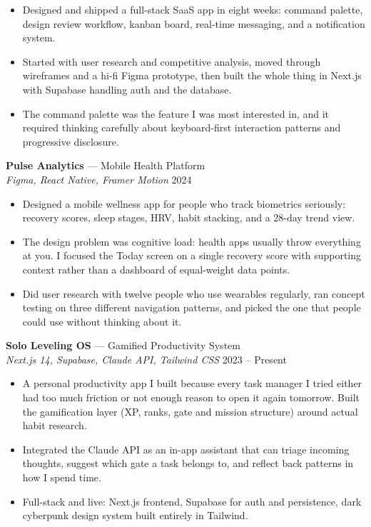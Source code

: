 \documentclass[11pt, letterpaper]{article}
\begin{document}
\begin{itemize}
  \item Designed and shipped a full-stack SaaS app in eight weeks: command
        palette, design review workflow, kanban board, real-time messaging,
        and a notification system.
  \item Started with user research and competitive analysis, moved through
        wireframes and a hi-fi Figma prototype, then built the whole thing
        in Next.js with Supabase handling auth and the database.
  \item The command palette was the feature I was most interested in, and it required thinking carefully about keyboard-first interaction
        patterns and progressive disclosure.
\end{itemize}

\vspace{5pt}
\textbf{Pulse Analytics} — Mobile Health Platform\\
\textit{Figma, React Native, Framer Motion} \hfill 2024

\begin{itemize}
  \item Designed a mobile wellness app for people who track biometrics
        seriously: recovery scores, sleep stages, HRV, habit stacking,
        and a 28-day trend view.
  \item The design problem was cognitive load: health apps usually throw
        everything at you. I focused the Today screen on a single recovery
        score with supporting context rather than a dashboard of equal-weight
        data points.
  \item Did user research with twelve people who use wearables regularly,
        ran concept testing on three different navigation patterns, and
        picked the one that people could use without thinking about it.
\end{itemize}

\vspace{5pt}
\textbf{Solo Leveling OS} — Gamified Productivity System\\
\textit{Next.js 14, Supabase, Claude API, Tailwind CSS} \hfill 2023 -- Present

\begin{itemize}
  \item A personal productivity app I built because every task manager
        I tried either had too much friction or not enough reason to open
        it again tomorrow. Built the gamification layer (XP, ranks, gate and mission structure) around actual habit research.
  \item Integrated the Claude API as an in-app assistant that can triage
        incoming thoughts, suggest which gate a task belongs to, and
        reflect back patterns in how I spend time.
  \item Full-stack and live: Next.js frontend, Supabase for auth and
        persistence, dark cyberpunk design system built entirely in Tailwind.
\end{itemize}
\end{document}
